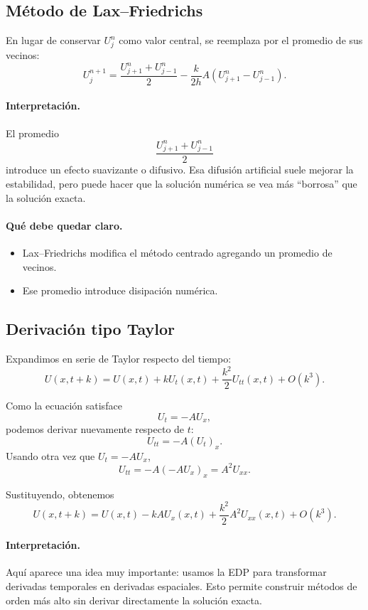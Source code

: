 \subsection{Método de Lax--Friedrichs}

En lugar de conservar \(U_j^n\) como valor central, se reemplaza por el promedio de sus vecinos:
\[
U_j^{n+1}
=
\frac{U_{j+1}^n+U_{j-1}^n}{2}
-
\frac{k}{2h}A\left(U_{j+1}^n-U_{j-1}^n\right).
\]

\paragraph{Interpretación.}
El promedio
\[
\frac{U_{j+1}^n+U_{j-1}^n}{2}
\]
introduce un efecto suavizante o difusivo. Esa difusión artificial suele mejorar la estabilidad, pero puede hacer que la solución numérica se vea más ``borrosa'' que la solución exacta.

\paragraph{Qué debe quedar claro.}
\begin{itemize}
    \item Lax--Friedrichs modifica el método centrado agregando un promedio de vecinos.
    \item Ese promedio introduce disipación numérica.
\end{itemize}

\subsection{Derivación tipo Taylor}

Expandimos en serie de Taylor respecto del tiempo:
\[
U(x,t+k)=U(x,t)+kU_t(x,t)+\frac{k^2}{2}U_{tt}(x,t)+O(k^3).
\]

Como la ecuación satisface
\[
U_t=-AU_x,
\]
podemos derivar nuevamente respecto de \(t\):
\[
U_{tt} = -A(U_t)_x.
\]
Usando otra vez que \(U_t=-AU_x\),
\[
U_{tt}
=
-A(-AU_x)_x
=
A^2U_{xx}.
\]

Sustituyendo, obtenemos
\[
U(x,t+k)
=
U(x,t)-kAU_x(x,t)+\frac{k^2}{2}A^2U_{xx}(x,t)+O(k^3).
\]

\paragraph{Interpretación.}
Aquí aparece una idea muy importante: usamos la EDP para transformar derivadas temporales en derivadas espaciales. Esto permite construir métodos de orden más alto sin derivar directamente la solución exacta.


